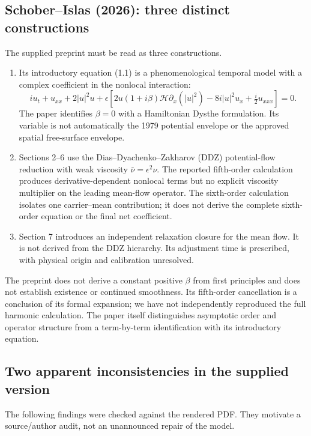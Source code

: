 \documentclass[11pt]{article}
\newcommand{\HH}{\mathcal H}
\begin{document}
\subsection{Schober--Islas (2026): three distinct constructions}
The supplied preprint \cite{schober} must be read as three constructions.
\begin{enumerate}
\item Its introductory equation (1.1) is a phenomenological temporal
model with a complex coefficient in the nonlocal interaction:
\begin{equation}
 i u_t+u_{xx}+2|u|^2u+
 \epsilon\left[2u(1+i\beta)\HH\partial_x(|u|^2)
 -8i|u|^2u_x+\tfrac i2u_{xxx}\right]=0.
 \label{eq:beta}
\end{equation}
The paper identifies \(\beta=0\) with a Hamiltonian Dysthe formulation.
Its variable is not automatically the 1979 potential envelope or the
approved spatial free-surface envelope.
\item Sections 2--6 use the Dias--Dyachenko--Zakharov (DDZ)
potential-flow reduction with weak viscosity
\(\bar\nu=\epsilon^2\nu\). The reported fifth-order calculation produces
derivative-dependent nonlocal terms but no explicit viscosity
multiplier on the leading mean-flow operator. The sixth-order
calculation isolates one carrier--mean contribution; it does not
derive the complete sixth-order equation or the final net coefficient.
\item Section 7 introduces an independent relaxation closure for the
mean flow. It is not derived from the DDZ hierarchy. Its adjustment
time is prescribed, with physical origin and calibration unresolved.
\end{enumerate}
The preprint does not derive a constant positive \(\beta\) from first
principles and does not establish existence or continued smoothness.
Its fifth-order cancellation is a conclusion of its formal expansion;
we have not independently reproduced the full harmonic calculation.
The paper itself distinguishes asymptotic order and operator structure
from a term-by-term identification with its introductory equation.

\subsection{Two apparent inconsistencies in the supplied version}
The following findings were checked against the rendered PDF. They
motivate a source/author audit, not an unannounced repair of the model.
\end{document}
